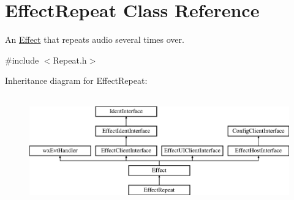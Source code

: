 \hypertarget{class_effect_repeat}{}\section{Effect\+Repeat Class Reference}
\label{class_effect_repeat}


An \hyperlink{class_effect}{Effect} that repeats audio several times over.  




{\ttfamily \#include $<$Repeat.\+h$>$}

Inheritance diagram for Effect\+Repeat\+:\begin{figure}[H]
\begin{center}
\leavevmode
\includegraphics[height=4.794520cm]{class_effect_repeat}
\end{center}
\end{figure}
